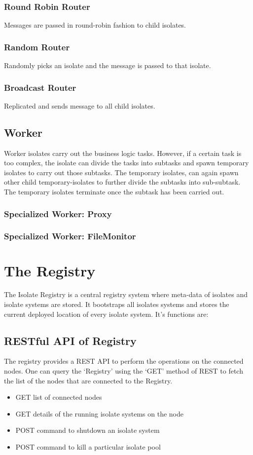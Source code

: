   \subsubsection{Round Robin Router}
    Messages are passed in round-robin fashion to child isolates.

  \subsubsection{Random Router}
  Randomly picks an isolate and the message is passed to that isolate.

  \subsubsection{Broadcast Router}
  Replicated and sends message to all child isolates.

  \subsection{Worker}
  Worker isolates carry out the business logic tasks. However, if a certain task is too complex, the isolate can divide the tasks into subtasks and spawn temporary isolates to carry out those subtasks. The temporary isolates, can again spawn other child temporary-isolates to further divide the subtasks into sub-subtask. The temporary isolates terminate once the subtask has been carried out.
  \subsubsection{Specialized Worker: Proxy}
  \subsubsection{Specialized Worker: FileMonitor}

\section{The Registry}
The Isolate Registry is a central registry system where meta-data of isolates and isolate systems are stored. It bootstraps all isolates systems and stores the current deployed location of every isolate system. It’s functions are:
  \subsection{RESTful API of Registry}
  The registry provides a REST API to perform the operations on the connected nodes. One can query the ‘Registry’ using the ‘GET’ method of REST to fetch the list of the nodes that are connected to the Registry.
  \begin{itemize}
  \item GET list of connected nodes
  \item GET details of the running isolate systems on the node
  \item POST command to shutdown an isolate system
  \item POST command to kill a particular isolate pool
  \end{itemize}


